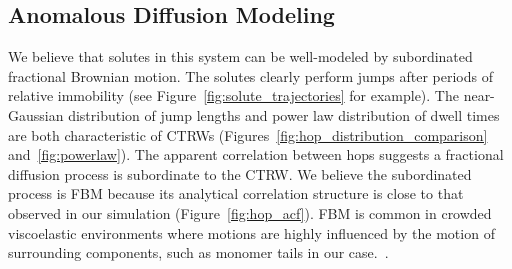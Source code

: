 \documentclass{article}
\begin{document}
  \subsection{Anomalous Diffusion Modeling}\label{section:sFBM}
  
  We believe that solutes in this system can be well-modeled by subordinated fractional
  Brownian motion. The solutes clearly perform jumps after periods of relative immobility
  (see Figure~\ref{fig:solute_trajectories} for example). The near-Gaussian distribution
  of jump lengths and power law distribution of dwell times are both characteristic of 
  CTRWs (Figures~\ref{fig:hop_distribution_comparison} and~\ref{fig:powerlaw}). The apparent
  correlation between hops suggests a fractional diffusion process is subordinate to the
  CTRW. We believe the subordinated process is FBM because its analytical correlation 
  structure is close to that observed in our simulation (Figure~\ref{fig:hop_acf}). FBM
  is common in crowded viscoelastic environments where motions are highly influenced by
  the motion of surrounding components, such as monomer tails in our case.~\cite{ernst_fractional_2012}.
  
\end{document}
